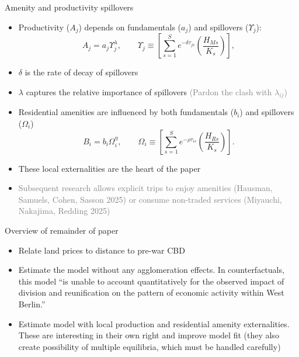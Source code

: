 \documentclass[11pt,notes=hide,aspectratio=169]{beamer}
\begin{document}
\begin{frame}{Amenity and productivity spillovers}
\begin{itemize}
\item Productivity ($A_j$) depends on fundamentals ($a_j$) and spillovers ($\Upsilon_{j}$):
\[
A_{j} = a_{j} \Upsilon_{j}^{\lambda}, \qquad \Upsilon_{j} \equiv \left[ \sum\limits_{s=1}^{S} e^{-\delta \tau_{js}} \left( \frac{H_{Ms}}{K_s} \right) \right],
\]
\item $\delta$ is the rate of decay of spillovers
\item $\lambda$ captures the relative importance of spillovers
\textcolor{gray}{(Pardon the clash with $\lambda_{ij}$)}
\item Residential amenities are influenced by both fundamentals ($b_{i}$) and spillovers ($\Omega_{i}$)
\[
 B_{i} = b_{i} \Omega_{i}^{\eta}, \qquad \Omega_{i} \equiv \left[ \sum\limits_{s=1}^{S} e^{-\rho \tau_{is}} \left( \frac{H_{Rs}}{K_s} \right) \right].
\]
\item These local externalities are the heart of the paper
\item[] {\footnotesize \textcolor{gray}{Subsequent research allows explicit trips to enjoy amenities (Hausman, Samuels, Cohen, Sasson  2025) or consume non-traded services (Miyauchi, Nakajima, Redding 2025)}\par}
\end{itemize}
\end{frame}
\begin{frame}{Overview of remainder of paper}
\begin{itemize}
\item Relate land prices to distance to pre-war CBD
\item Estimate the model without any agglomeration effects. In counterfactuals, this model ``is unable to account quantitatively for the observed impact of division and reunification on the pattern of economic activity within West Berlin.''
\item Estimate model with local production and residential amenity externalities. These are interesting in their own right and improve model fit (they also create possibility of multiple equilibria, which must be handled carefully)
\end{itemize}
\end{frame}
\end{document}
